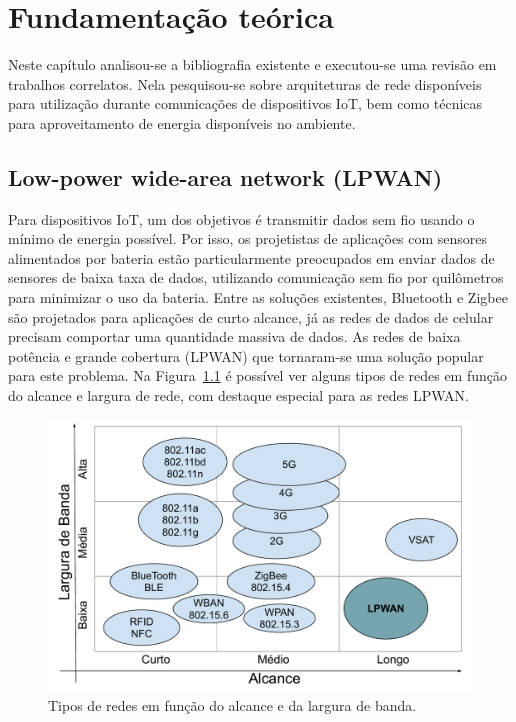 \chapter{Fundamentação teórica}
Neste capítulo analisou-se a bibliografia existente e executou-se uma revisão em trabalhos correlatos. Nela pesquisou-se sobre arquiteturas de rede disponíveis para utilização durante comunicações de dispositivos IoT, bem como técnicas para aproveitamento de energia disponíveis no ambiente.

\section{Low-power wide-area network (LPWAN)} %
Para dispositivos IoT, um dos objetivos é transmitir dados sem fio usando o mínimo de energia possível. Por isso, os projetistas de aplicações com sensores alimentados por bateria estão particularmente preocupados em enviar dados de sensores de baixa taxa de dados, utilizando comunicação sem fio por quilômetros para minimizar o uso da bateria. Entre as soluções existentes, Bluetooth e Zigbee são projetados para aplicações de curto alcance, já as redes de dados de celular precisam comportar uma quantidade massiva de dados. As redes de baixa potência e grande cobertura (LPWAN) que tornaram-se uma solução popular para este problema. Na Figura~\ref{fig:LPWAN} é possível ver alguns tipos de redes em função do alcance e largura de rede, com destaque especial para as redes LPWAN.


\begin{figure}[h!]
  \caption{Tipos de redes em função do alcance e da largura de banda.}
  \begin{center}
      \includegraphics[scale=0.7]{img/LPWAN.pdf}
  \end{center}
  \label{fig:LPWAN}
\end{figure}

